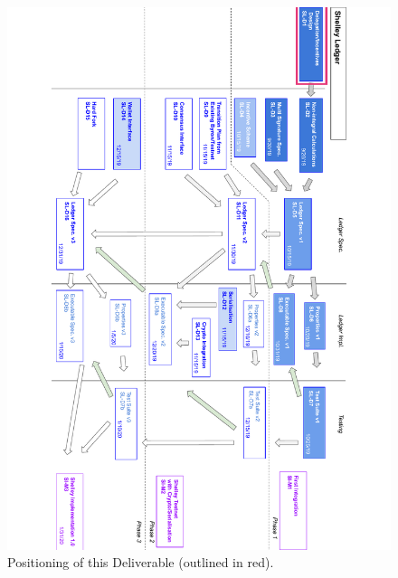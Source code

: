 \documentclass[11pt,a4paper,dvipsnames,twosided]{article}
\begin{document}
\clearpage%
\begin{landscape}
\begin{figure}
\includegraphics[scale=0.8,angle=90]{d1-depends.pdf}
\caption{Positioning of this Deliverable (outlined in red).}
\end{figure}
\end{landscape}
\cleardoublepage

\renewcommand{\thepage}{\arabic{page}}
\setcounter{page}{1}
\end{document}

